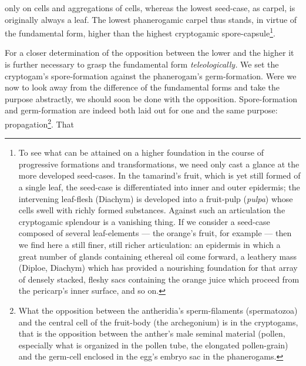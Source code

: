 \documentclass[12pt,a4paper]{book}
\begin{document}
\setcounter{footnote}{0}
only on cells and aggregations of cells, whereas the lowest seed-case, as carpel,
is originally always a leaf. The lowest phanerogamic carpel thus stands, in virtue
of the fundamental form, higher than the highest cryptogamic
spore-capsule\footnote{To see what can be attained on a higher foundation in the
course of progressive formations and transformations, we need only cast a glance
at the more developed seed-cases. In the tamarind's fruit, which is yet still
formed of a single leaf, the seed-case is differentiated into inner and outer
epidermis; the intervening leaf-flesh (Diachym) is developed into a fruit-pulp
(\textit{pulpa}) whose cells swell with richly formed substances. Against such an
articulation the cryptogamic splendour is a vanishing thing. If we consider a
seed-case composed of several leaf-elements --- the orange's fruit, for example
--- then we find here a still finer, still richer articulation: an epidermis in
which a great number of glands containing ethereal oil come forward, a leathery
mass (Diploe, Diachym) which has provided a nourishing foundation for that array
of densely stacked, fleshy sacs containing the orange juice which proceed from the
pericarp's inner surface, and so on.
}.

For a closer determination of the opposition between the lower and the higher it
is further necessary to grasp the fundamental form \emph{teleologically.} We set
the cryptogam's spore-formation against the phanerogam's germ-formation. Were we
now to look away from the difference of the fundamental forms and take the purpose
abstractly, we should soon be done with the opposition. Spore-formation and
germ-formation are indeed both laid out for one and the same purpose:
propagation\footnote{What the opposition between the antheridia's sperm-filaments
(spermatozoa) and the central cell of the fruit-body (the archegonium) is in the
cryptogams, that is the opposition between the anther's male seminal material
(pollen, especially what is organized in the pollen tube, the elongated
pollen-grain) and the germ-cell enclosed in the egg's embryo sac in the
phanerogams.}. That
\end{document}
